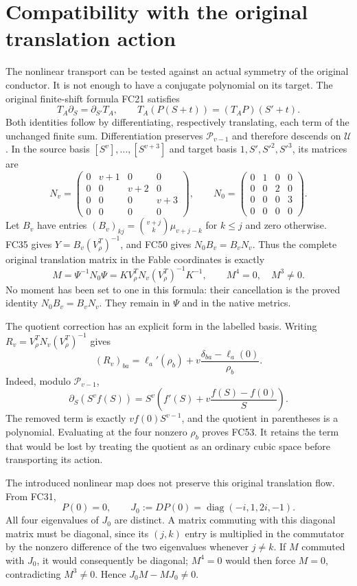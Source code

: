 \documentclass[11pt]{article}
\newcommand{\diag}{\operatorname{diag}}
\begin{document}
\section{Compatibility with the original translation action}
The nonlinear transport can be tested against an actual symmetry of the
original conductor. It is not enough to have a conjugate polynomial
on its target. The original finite-shift formula FC21 satisfies
\[
 T_A\partial_S=\partial_{S'}T_A,\qquad
 T_A(P(S+t))=(T_AP)(S'+t).
 \tag{FC50}
\]
Both identities follow by differentiating, respectively translating,
each term of the unchanged finite sum. Differentiation preserves
$\mathcal P_{v-1}$ and therefore descends on $\mathcal U$.
In the source basis $[S^v],\ldots,[S^{v+3}]$ and target basis
$1,S',S'^2,S'^3$, its matrices are
\[
 N_v=\begin{pmatrix}0&v+1&0&0\\0&0&v+2&0\\0&0&0&v+3\\0&0&0&0\end{pmatrix},
 \qquad
 N_0=\begin{pmatrix}0&1&0&0\\0&0&2&0\\0&0&0&3\\0&0&0&0\end{pmatrix}.
 \tag{FC51}
\]
Let $B_v$ have entries
$(B_v)_{kj}=\binom{v+j}{k}\mu_{v+j-k}$ for $k\le j$ and zero
otherwise. FC35 gives $Y=B_v(V_\rho^T)^{-1}$, and FC50 gives
$N_0B_v=B_vN_v$. Thus the complete original translation matrix
in the Fable coordinates is exactly
\[
 M=\Psi^{-1}N_0\Psi
   =K V_\rho^T N_v(V_\rho^T)^{-1}K^{-1},\qquad M^4=0,
 \quad M^3\ne0.
 \tag{FC52}
\]
No moment has been set to one in this formula: their cancellation is
the proved identity $N_0B_v=B_vN_v$. They remain in $\Psi$ and in
the native metrics.

The quotient correction has an explicit form in the labelled basis.
Writing $R_v=V_\rho^T N_v(V_\rho^T)^{-1}$ gives
\[
 (R_v)_{ba}=\ell_a'(\rho_b)
          +v\frac{\delta_{ba}-\ell_a(0)}{\rho_b}.
 \tag{FC53}
\]
Indeed, modulo $\mathcal P_{v-1}$,
\[
 \partial_S(S^vf(S))
 =S^v\left(f'(S)+v\frac{f(S)-f(0)}S\right).
\]
The removed term is exactly $vf(0)S^{v-1}$, and the quotient in
parentheses is a polynomial. Evaluating at the four nonzero $\rho_b$
proves FC53. It retains the term that would be lost by treating the
quotient as an ordinary cubic space before transporting its action.

The introduced nonlinear map does not preserve this original
translation flow. From FC31,
\[
 P(0)=0,\qquad J_0:=DP(0)=\diag(-i,1,2i,-1).
 \tag{FC54}
\]
All four eigenvalues of $J_0$ are distinct. A matrix commuting with
this diagonal matrix must be diagonal, since its $(j,k)$ entry is
multiplied in the commutator by the nonzero difference of the two
eigenvalues whenever $j\ne k$. If $M$ commuted with $J_0$, it
would consequently be diagonal; $M^4=0$ would then force $M=0$,
contradicting $M^3\ne0$. Hence $J_0M-MJ_0\ne0$.
\end{document}
